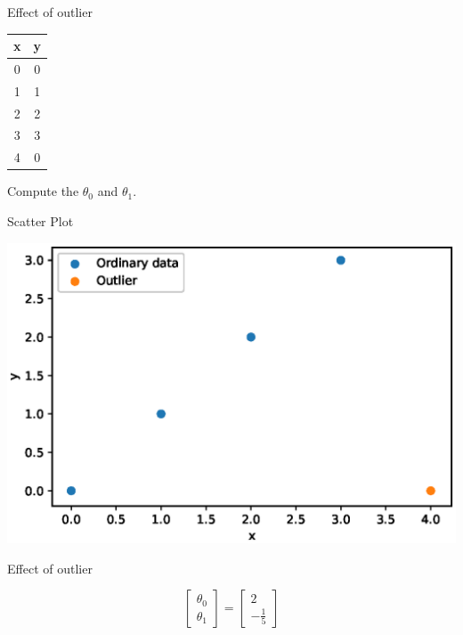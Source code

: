 \documentclass{beamer}
\begin{document}
\begin{frame}{Effect of outlier}

    \begin{center}
 \begin{tabular}{||c c||} 
 \hline
 x  & y \\ [0.5ex] 
 \hline\hline
 0 & 0 \\
 1 & 1 \\
 2 & 2 \\
 3 & 3 \\
 4 & 0 \\
 \hline
\end{tabular}
\end{center}

Compute the $\theta_{0}$ and $\theta_{1}$.
\end{frame}
\begin{frame}{Scatter Plot}
    
    \begin{center}
        \includegraphics[totalheight=6cm]{linear-reg/scatterplot-3.eps}
\end{center}

\end{frame}


\begin{frame}{Effect of outlier}
    
    \begin{center}
    	$$
        \begin{bmatrix}
        \theta_{0}\\
        \theta_{1}
        
    \end{bmatrix}
     = 
     \begin{bmatrix}
        2\\
        -\frac{1}{5}
    \end{bmatrix}
$$
    \end{center}
    
\end{frame}
\end{document}
